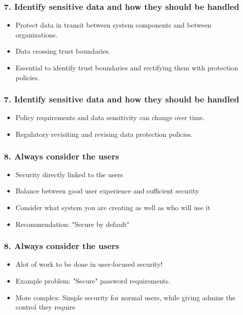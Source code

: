 \documentclass[12pt,norsk]{beamer}
\begin{document}
\begin{frame}

	\frametitle{7. Identify sensitive data and how they should be handled}
	\begin{itemize}

		\item Protect data in transit between system components and between organizations.
		\item Data crossing trust boundaries.
		\item Essential to identify trust boundaries and rectifying them with protection policies.
		
		
		
	\end{itemize}
	

\end{frame}


\begin{frame}

	\frametitle{7. Identify sensitive data and how they should be handled}
	\begin{itemize}

		\item Policy requirements and data sensitivity can change over time.
		\item Regulatory revisiting and revising data protection policies.		
		
	\end{itemize}
	

\end{frame}

\begin{frame}

	\frametitle{8. Always consider the users}
	
	\begin{itemize}
	
		\item Security directly linked to the users
		\item Balance between good user experience and sufficient security
		\item Consider what system you are creating as well as who will use it
		\item Recommendation: "Secure by default"
	\end{itemize}

\end{frame}

\begin{frame}
 
	\frametitle{8. Always consider the users}
	
	\begin{itemize}
	
	\item Alot of work to be done in user-focused security!
	\item Example problem: "Secure" password requirements.
	\item More complex: Simple security for normal users, while giving admins the control they require
	
	\end{itemize}

\end{frame}
\end{document}
